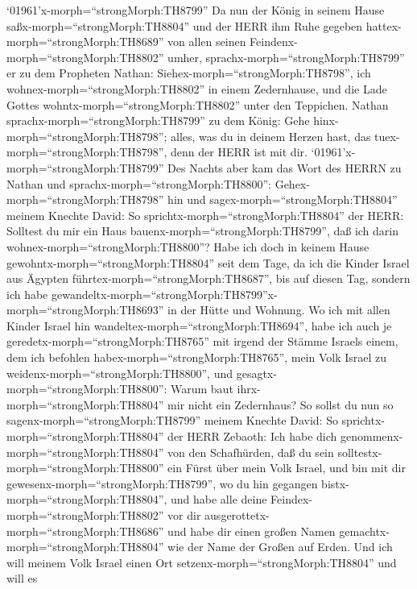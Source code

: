  `01961'\textbar x-morph=``strongMorph:TH8799'' Da nun der
König in seinem Hause saßx-morph=``strongMorph:TH8804'' und der HERR ihm
Ruhe gegeben hattex-morph=``strongMorph:TH8689'' von allen seinen
Feindenx-morph=``strongMorph:TH8802'' umher, 
sprachx-morph=``strongMorph:TH8799'' er zu dem Propheten Nathan:
Siehex-morph=``strongMorph:TH8798'', ich
wohnex-morph=``strongMorph:TH8802'' in einem Zedernhause, und die Lade
Gottes wohntx-morph=``strongMorph:TH8802'' unter den Teppichen.
 Nathan sprachx-morph=``strongMorph:TH8799'' zu dem König:
Gehe hinx-morph=``strongMorph:TH8798''; alles, was du in deinem Herzen
hast, das tuex-morph=``strongMorph:TH8798'', denn der HERR ist mit dir.
 `01961'\textbar x-morph=``strongMorph:TH8799'' Des Nachts
aber kam das Wort des HERRN zu Nathan und
sprachx-morph=``strongMorph:TH8800'': 
Gehex-morph=``strongMorph:TH8798'' hin und
sagex-morph=``strongMorph:TH8804'' meinem Knechte David: So
sprichtx-morph=``strongMorph:TH8804'' der HERR: Solltest du mir ein Haus
bauenx-morph=``strongMorph:TH8799'', daß ich darin
wohnex-morph=``strongMorph:TH8800''?  Habe ich doch in
keinem Hause gewohntx-morph=``strongMorph:TH8804'' seit dem Tage, da ich
die Kinder Israel aus Ägypten führtex-morph=``strongMorph:TH8687'', bis
auf diesen Tag, sondern ich habe
gewandeltx-morph=``strongMorph:TH8799''x-morph=``strongMorph:TH8693'' in
der Hütte und Wohnung.  Wo ich mit allen Kinder Israel hin
wandeltex-morph=``strongMorph:TH8694'', habe ich auch je
geredetx-morph=``strongMorph:TH8765'' mit irgend der Stämme Israels
einem, dem ich befohlen habex-morph=``strongMorph:TH8765'', mein Volk
Israel zu weidenx-morph=``strongMorph:TH8800'', und
gesagtx-morph=``strongMorph:TH8800'': Warum baut
ihrx-morph=``strongMorph:TH8804'' mir nicht ein Zedernhaus? 
So sollst du nun so sagenx-morph=``strongMorph:TH8799'' meinem Knechte
David: So sprichtx-morph=``strongMorph:TH8804'' der HERR Zebaoth: Ich
habe dich genommenx-morph=``strongMorph:TH8804'' von den Schafhürden,
daß du sein solltestx-morph=``strongMorph:TH8800'' ein Fürst über mein
Volk Israel,  und bin mit dir
gewesenx-morph=``strongMorph:TH8799'', wo du hin gegangen
bistx-morph=``strongMorph:TH8804'', und habe alle deine
Feindex-morph=``strongMorph:TH8802'' vor dir
ausgerottetx-morph=``strongMorph:TH8686'' und habe dir einen großen
Namen gemachtx-morph=``strongMorph:TH8804'' wie der Name der Großen auf
Erden.  Und ich will meinem Volk Israel einen Ort
setzenx-morph=``strongMorph:TH8804'' und will es
